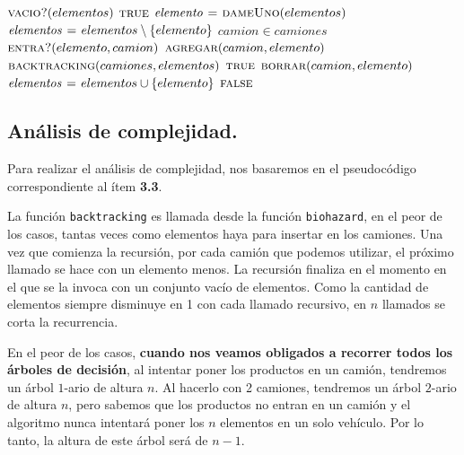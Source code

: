 \vspace*{0.5cm}


\begin{codebox}
\li \If $\textnormal{\scshape vacio?}(elementos)$
\li     \Then
            \Return $\textnormal{\scshape true}$
        \End
\li $\id{elemento} \gets \proc{dameUno}(elementos)$
\li $\id{elementos} \gets elementos \setminus \{elemento\}$
\li \For $camion \in camiones$
\li     \Do
            \If $\textnormal{\scshape entra?}(elemento, camion)$
\li             \Then
                    $\textnormal{\scshape agregar}(camion, elemento)$
\li                 \If $\textnormal{\scshape backtracking}(camiones, elementos)$
                        \Then
\li                         \Return $\textnormal{\scshape true}$
\li                 \Else
\li                     $\textnormal{\scshape borrar}(camion, elemento)$
                    \End
            \End
        \End
\li $\id{elementos} \gets elementos \cup \{elemento\}$
\li \Return $\textnormal{\scshape false}$
\end{codebox}



\newpage
\subsection{Análisis de complejidad.}

\vspace*{0.3cm}


Para realizar el análisis de complejidad, nos basaremos en el pseudocódigo
correspondiente al ítem \textbf{3.3}.

La función \verb|backtracking| es llamada desde la función \verb|biohazard|, en
el peor de los casos, tantas veces como elementos haya para insertar en los camiones.
Una vez que comienza la recursión, por cada camión que podemos utilizar,
el próximo llamado se hace con un elemento menos. La recursión finaliza en el momento en
el que se la invoca con un conjunto vacío de elementos. Como la cantidad de
elementos siempre disminuye en 1 con cada llamado recursivo, en $n$ llamados se
corta la recurrencia.

En el peor de los casos, \textbf{cuando nos veamos obligados a recorrer
todos los árboles de decisión}, al intentar poner los productos en un
camión, tendremos un árbol $1$-ario de altura $n$. Al hacerlo con 2
camiones, tendremos un árbol $2$-ario de altura $n$, pero sabemos que los
productos no entran en un camión y el algoritmo nunca intentará poner los
$n$ elementos en un solo vehículo. Por lo tanto, la altura de este árbol será
de $n - 1$.

